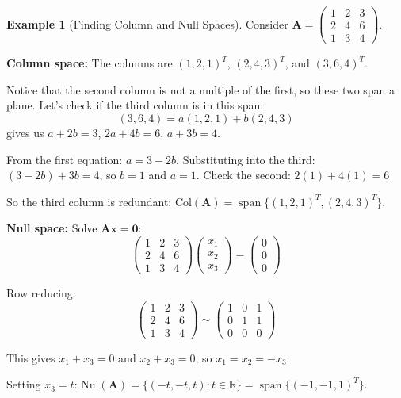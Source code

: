 \documentclass[12pt]{article}
\numberwithin{equation}{section}
\newcommand{\vect}[1]{\boldsymbol{#1}}   %
\newcommand{\mat}[1]{\mathbf{#1}}        %
\newcommand{\Span}{\operatorname{span}}
\theoremstyle{plain}
\theoremstyle{definition}
\newtheorem{example}[theorem]{Example}
\theoremstyle{remark}
\begin{document}
\begin{example}[Finding Column and Null Spaces]
Consider $\mat{A} = \begin{pmatrix} 1 & 2 & 3 \\ 2 & 4 & 6 \\ 1 & 3 & 4 \end{pmatrix}$.

\textbf{Column space:} The columns are $(1, 2, 1)^T$, $(2, 4, 3)^T$, and $(3, 6, 4)^T$.

Notice that the second column is not a multiple of the first, so these two span a plane. Let's check if the third column is in this span:
$$(3, 6, 4) = a(1, 2, 1) + b(2, 4, 3)$$
gives us $a + 2b = 3$, $2a + 4b = 6$, $a + 3b = 4$.

From the first equation: $a = 3 - 2b$. 
Substituting into the third: $(3 - 2b) + 3b = 4$, so $b = 1$ and $a = 1$.
Check the second: $2(1) + 4(1) = 6$ \checkmark

So the third column is redundant: $\text{Col}(\mat{A}) = \Span\{(1, 2, 1)^T, (2, 4, 3)^T\}$.

\textbf{Null space:} Solve $\mat{A}\vect{x} = \vect{0}$:
$$\begin{pmatrix} 1 & 2 & 3 \\ 2 & 4 & 6 \\ 1 & 3 & 4 \end{pmatrix} \begin{pmatrix} x_1 \\ x_2 \\ x_3 \end{pmatrix} = \begin{pmatrix} 0 \\ 0 \\ 0 \end{pmatrix}$$

Row reducing:
$$\begin{pmatrix} 1 & 2 & 3 \\ 2 & 4 & 6 \\ 1 & 3 & 4 \end{pmatrix} \sim \begin{pmatrix} 1 & 0 & 1 \\ 0 & 1 & 1 \\ 0 & 0 & 0 \end{pmatrix}$$

This gives $x_1 + x_3 = 0$ and $x_2 + x_3 = 0$, so $x_1 = x_2 = -x_3$.

Setting $x_3 = t$: $\text{Nul}(\mat{A}) = \{(-t, -t, t) : t \in \mathbb{R}\} = \Span\{(-1, -1, 1)^T\}$.
\end{example}
\end{document}
